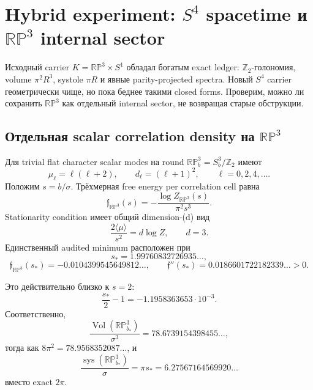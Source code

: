 \chapter{Hybrid experiment: \texorpdfstring{\(S^4\)}{S4} spacetime и \texorpdfstring{\(\mathbb{RP}^3\)}{RP3} internal sector}

Исходный carrier \(K=\mathbb{RP}^3\times S^1\) обладал богатым exact
ledger: \(\mathbb Z_2\)-голономия, volume \(\pi^2R^3\), systole \(\pi R\)
и явные parity-projected spectra. Новый \(S^4\) carrier геометрически чище,
но пока беднее такими closed forms. Проверим, можно ли сохранить
\(\mathbb{RP}^3\) как отдельный internal sector, не возвращая старые
обструкции.

\section{Отдельная scalar correlation density на
\texorpdfstring{\(\mathbb{RP}^3\)}{RP3}}

Для trivial flat character scalar modes на round
\(\mathbb{RP}^3_b=S^3_b/\mathbb Z_2\) имеют
\begin{equation}
 \mu_\ell=\ell(\ell+2),
 \qquad
 d_\ell=(\ell+1)^2,
 \qquad
 \ell=0,2,4,\ldots.
\end{equation}
Положим \(s=b/\sigma\). Трёхмерная free energy per correlation cell равна
\begin{equation}
 \mathfrak f_{\mathbb{RP}^3}(s)
 =-\frac{\log Z_{\mathbb{RP}^3}(s)}{\pi^2s^3}.
\end{equation}
Stationarity condition имеет общий dimension-(d) вид
\begin{equation}
 \frac{2\langle\mu\rangle}{s^2}=d\log Z,
 \qquad d=3.
\end{equation}
Единственный audited minimum расположен при
\begin{equation}
 s_*=1.99760832726935\ldots,
 \end{equation}
\begin{equation}
 \mathfrak f_{\mathbb{RP}^3}(s_*)
 =-0.0104399545649812\ldots,
 \qquad
 \mathfrak f''(s_*)=0.0186601722182339\ldots>0.
\end{equation}

Это действительно близко к \(s=2\):
\begin{equation}
 \frac{s_*}{2}-1=-1.1958363653\cdot10^{-3}.
\end{equation}
Соответственно,
\begin{equation}
 \frac{\operatorname{Vol}(\mathbb{RP}^3_{b_*})}{\sigma^3}
 =78.6739154398455\ldots,
\end{equation}
тогда как \(8\pi^2=78.9568352087\ldots\), и
\begin{equation}
 \frac{\operatorname{sys}(\mathbb{RP}^3_{b_*})}{\sigma}
 =\pi s_*=6.27567164569920\ldots
\end{equation}
вместо exact \(2\pi\).

